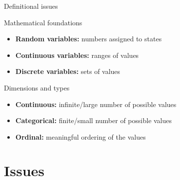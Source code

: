 \documentclass[t]{beamer}
\begin{document}
	\begin{frame}[t]{Definitional issues}
	
     \begin{block}{Mathematical foundations}

        \begin{itemize}
  				\item \textbf{Random variables:} numbers assigned to states
          \item \textbf{Continuous variables:} ranges of values
      		\item \textbf{Discrete variables:} sets of values
        \end{itemize}
     
     \end{block}     	

	   \begin{block}{Dimensions and types}
	     
	     \begin{itemize}
		     \item \textbf{Continuous:} infinite/large number of possible values
		     \item \textbf{Categorical:} finite/small number of possible values
		     \item \textbf{Ordinal:} meaningful ordering of the values
	     \end{itemize}

	   \end{block}

	\end{frame}
	
	\section{Issues}
	
\end{document}
